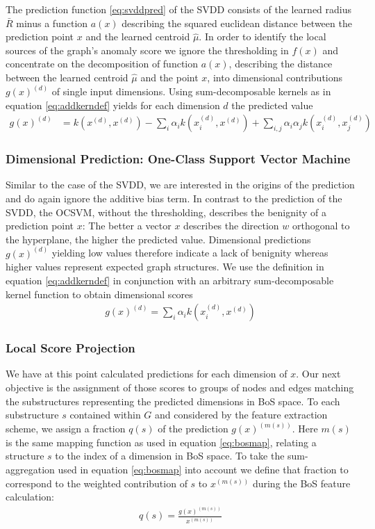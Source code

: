 \documentclass{llncs}
\begin{document}
The prediction function \eqref{eq:svddpred} of the SVDD consists of the learned radius $\bar{R}$ minus a function $a(x)$ describing the squared euclidean distance between the prediction point $x$ and the learned centroid $\hat{\mu}$. In order to identify the local sources of the graph's anomaly score we ignore the thresholding in $f(x)$ and concentrate on the decomposition of function $a(x)$, describing the distance between the learned centroid $\hat\mu$ and the point $x$, into dimensional contributions $g(x)^{(d)}$ of single input dimensions. Using sum-decomposable kernels as in equation \eqref{eq:addkerndef} yields for each dimension $d$ the predicted value
\begin{align}
g(x)^{(d)} &= k(x^{(d)},x^{(d)}) - \sum\limits_i \alpha_i k(x_i^{(d)}, x^{(d)}) + \sum\limits_{i,j} \alpha_i\alpha_j k(x_i^{(d)},x_j^{(d)})
\end{align}


\subsubsection{Dimensional Prediction: One-Class Support Vector Machine}

Similar to the case of the SVDD, we are interested in the origins of the prediction and do again ignore the additive bias term.
In contrast to the prediction of the SVDD, the OCSVM, without the thresholding,  describes the benignity of a prediction point $x$: The better a vector $x$ describes the direction $w$ orthogonal to the hyperplane, the higher the predicted value.
Dimensional predictions $g(x)^{(d)}$ yielding low values therefore indicate a lack of benignity whereas higher values represent expected graph structures. We use the definition in equation \eqref{eq:addkerndef} in conjunction with an arbitrary sum-decomposable kernel function to obtain dimensional scores
\begin{align}
g(x)^{(d)} = \sum\limits_i \alpha_i k(x_i^{(d)}, x^{(d)})
\end{align}


\subsubsection{Local Score Projection}
\label{sec:localscore}

We have at this point calculated predictions for each dimension of $x$. Our next objective is the assignment of those scores to groups of nodes and edges matching the substructures representing the predicted dimensions in BoS space.
To each substructure $s$ contained within $G$ and considered by the feature extraction scheme, we assign a fraction $q(s)$ of the prediction $g(x)^{(m(s))}$. Here $m(s)$ is the same mapping function as used in equation  \eqref{eq:bosmap}, relating a structure $s$ to the index of a dimension in BoS space.
To take the sum-aggregation used in equation \eqref{eq:bosmap} into account we define that fraction to correspond to the weighted contribution of $s$ to $x^{(m(s))}$ during the BoS feature calculation:
\begin{align}
q(s) = \frac{g(x)^{(m(s))}}{x^{(m(s))}}
\end{align}
\end{document}
